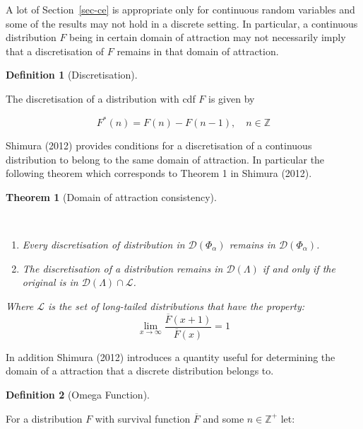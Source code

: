 \documentclass[
  10pt,
  a4paper,
]{scrreprt}
\providecommand{\tightlist}{%
  \setlength{\itemsep}{0pt}\setlength{\parskip}{0pt}}\usepackage{longtable,booktabs,array}
\theoremstyle{definition}
\newtheorem{definition}{Definition}[section]
\theoremstyle{plain}
\newtheorem{theorem}{Theorem}[section]
\theoremstyle{remark}
\begin{document}
{A lot of Section~\ref{sec-ce} is appropriate only for continuous random
variables and some of the results may not hold in a discrete setting. In
particular, a continuous distribution \(F\) being in certain domain of
attraction may not necessarily imply that a discretisation of \(F\)
remains in that domain of attraction.

\begin{definition}[Discretisation]\protect\hypertarget{def-disc}{}\label{def-disc}

The discretisation of a distribution with cdf \(F\) is given by

\[F^*(n) = F(n) - F(n-1), \quad n   \in \mathbb Z\]

\end{definition}

Shimura (2012) provides conditions for a discretisation of a continuous
distribution to belong to the same domain of attraction. In particular
the following theorem which corresponds to Theorem 1 in Shimura (2012).

\begin{theorem}[Domain of attraction
consistency]\protect\hypertarget{thm-shimura1}{}\label{thm-shimura1}

~

\begin{enumerate}
\def\labelenumi{(\alph{enumi})}
\tightlist
\item
  Every discretisation of distribution in \(\mathcal D(\Phi_\alpha)\)
  remains in \(\mathcal D(\Phi_\alpha)\).
\item
  The discretisation of a distribution remains in
  \(\mathcal D(\Lambda)\) if and only if the original is in
  \(\mathcal D(\Lambda)\cap \mathcal L\).
\end{enumerate}

Where \(\mathcal L\) is the set of long-tailed distributions that have
the property: \[
\lim_{x\rightarrow \infty}\displaystyle\frac{\overline F(x+1)}{\overline F(x)} = 1   
\]

\end{theorem}

In addition Shimura (2012) introduces a quantity useful for determining
the domain of a attraction that a discrete distribution belongs to.

\begin{definition}[Omega
Function]\protect\hypertarget{def-omega}{}\label{def-omega}

For a distribution \(F\) with survival function \(\overline F\) and some
\(n\in\mathbb Z^+\) let:


\end{definition}}
\end{document}

